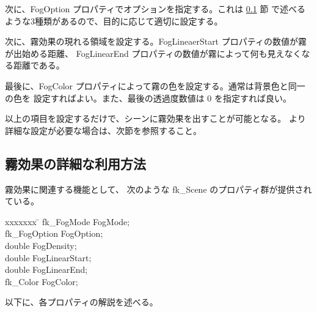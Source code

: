 次に、FogOption プロパティでオプションを指定する。これは \ref{subsec:scenefogref} 節
で述べるような3種類があるので、目的に応じて適切に設定する。

次に、霧効果の現れる領域を設定する。FogLineaerStart プロパティの数値が霧が出始める距離、
FogLinearEnd プロパティの数値が霧によって何も見えなくなる距離である。

最後に、FogColor プロパティによって霧の色を設定する。通常は背景色と同一の色を
設定すればよい。また、最後の透過度数値は 0 を指定すれば良い。

以上の項目を設定するだけで、シーンに霧効果を出すことが可能となる。
より詳細な設定が必要な場合は、次節を参照すること。
\subsection{霧効果の詳細な利用方法} \label{subsec:scenefogref}
霧効果に関連する機能として、
次のような fk\_Scene のプロパティ群が提供されている。
\begin{bf}
\begin{tabbing}
xxxxxxx \= \kill
\> fk\_FogMode FogMode; \\
\> fk\_FogOption FogOption; \\
\> double FogDensity; \\
\> double FogLinearStart; \\
\> double FogLinearEnd; \\
\> fk\_Color FogColor; \\
\end{tabbing}
\end{bf}
以下に、各プロパティの解説を述べる。
